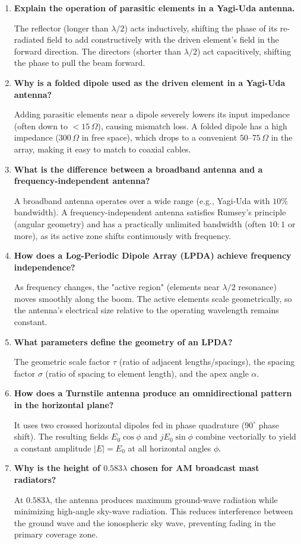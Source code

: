 \documentclass[12pt,a4paper]{article}
\newcommand{\Q}[1]{\textbf{#1}\par\noindent\ignorespaces}
\begin{document}
\begin{tcolorbox}[exambox, title={\textbf{Frequently Asked / Viva Questions}}]
\begin{enumerate}[topsep=0pt, label=\textbf{Q\arabic*.}, itemsep=5pt]
  \item \Q{Explain the operation of parasitic elements in a Yagi-Uda antenna.}
    The reflector (longer than $\lambda/2$) acts inductively, shifting the phase of its re-radiated field to add constructively with the driven element's field in the forward direction. The directors (shorter than $\lambda/2$) act capacitively, shifting the phase to pull the beam forward.
  \item \Q{Why is a folded dipole used as the driven element in a Yagi-Uda antenna?}
    Adding parasitic elements near a dipole severely lowers its input impedance (often down to $<15\,\Omega$), causing mismatch loss. A folded dipole has a high impedance ($300\,\Omega$ in free space), which drops to a convenient $50$–$75\,\Omega$ in the array, making it easy to match to coaxial cables.
  \item \Q{What is the difference between a broadband antenna and a frequency-independent antenna?}
    A broadband antenna operates over a wide range (e.g., Yagi-Uda with $10\%$ bandwidth). A frequency-independent antenna satisfies Rumsey's principle (angular geometry) and has a practically unlimited bandwidth (often $10:1$ or more), as its active zone shifts continuously with frequency.
  \item \Q{How does a Log-Periodic Dipole Array (LPDA) achieve frequency independence?}
    As frequency changes, the "active region" (elements near $\lambda/2$ resonance) moves smoothly along the boom. The active elements scale geometrically, so the antenna's electrical size relative to the operating wavelength remains constant.
  \item \Q{What parameters define the geometry of an LPDA?}
    The geometric scale factor $\tau$ (ratio of adjacent lengths/spacings), the spacing factor $\sigma$ (ratio of spacing to element length), and the apex angle $\alpha$.
  \item \Q{How does a Turnstile antenna produce an omnidirectional pattern in the horizontal plane?}
    It uses two crossed horizontal dipoles fed in phase quadrature ($90^\circ$ phase shift). The resulting fields $E_0\cos\phi$ and $jE_0\sin\phi$ combine vectorially to yield a constant amplitude $|E| = E_0$ at all horizontal angles $\phi$.
  \item \Q{Why is the height of $0.583\lambda$ chosen for AM broadcast mast radiators?}
    At $0.583\lambda$, the antenna produces maximum ground-wave radiation while minimizing high-angle sky-wave radiation. This reduces interference between the ground wave and the ionospheric sky wave, preventing fading in the primary coverage zone.
\end{enumerate}
\end{tcolorbox}
\end{document}
